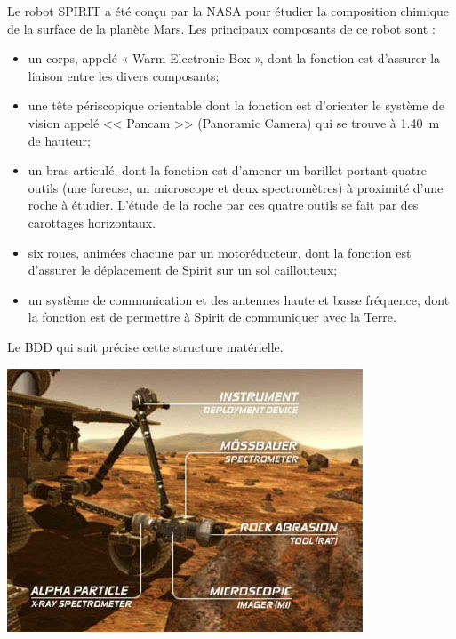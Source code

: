 \documentclass[10pt,fleqn]{article} %
\begin{document}
\begin{multicols}{2}
\begin{multicols}{2}
Le robot SPIRIT a été conçu par la NASA pour étudier la composition chimique de la surface de la planète Mars. Les principaux composants de ce robot sont :
\begin{itemize}
\item un corps, appelé « Warm Electronic Box », dont la fonction est d’assurer la liaison entre les divers composants;%
\item une tête périscopique orientable dont la fonction est d’orienter le système de vision appelé << Pancam >> (Panoramic Camera) qui se trouve à \SI{1,40}{m} de hauteur;%
\item un bras articulé, dont la fonction est d’amener un barillet portant quatre outils (une foreuse, un microscope et deux spectromètres) à proximité d’une roche à étudier. L’étude de la roche par ces quatre outils se fait par des carottages horizontaux.
\item six roues, animées chacune par un motoréducteur, dont la fonction est d’assurer le déplacement de Spirit sur un sol caillouteux;%
\item un système de communication et des antennes haute et basse fréquence, dont la fonction est de permettre à Spirit de communiquer avec la Terre.
\end{itemize}
Le BDD qui suit précise cette structure matérielle.


\begin{center}
\includegraphics[width=.8\linewidth]{images/fig_03.png}
\end{center}



\end{multicols}
\end{multicols}
\end{document}
